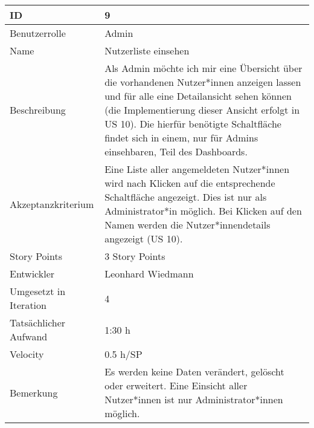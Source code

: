 \begin{tabularx}{\textwidth}{|p{}|X|}
	\hline
	ID & 9\\
	\hline
	Benutzerrolle & Admin\\
	\hline
	Name & Nutzerliste einsehen\\
	\hline
	Beschreibung & Als Admin möchte ich mir eine Übersicht über die vorhandenen Nutzer*innen anzeigen lassen und für alle eine Detailansicht sehen können (die Implementierung dieser Ansicht erfolgt in US 10). Die hierfür benötigte Schaltfläche findet sich in einem, nur für Admins einsehbaren, Teil des Dashboards.\\
	\hline
	Akzeptanzkriterium & Eine Liste aller angemeldeten Nutzer*innen wird nach Klicken auf die entsprechende Schaltfläche angezeigt. Dies ist nur als Administrator*in möglich. Bei Klicken auf den Namen werden die Nutzer*innendetails angezeigt (US 10).\\
	\hline
	Story Points & 3 Story Points\\
	\hline
	Entwickler & Leonhard Wiedmann\\
	\hline
	Umgesetzt in Iteration & 4\\
	\hline
	Tatsächlicher Aufwand & 1:30 h\\
	\hline
	Velocity & 0.5 h/SP\\
	\hline
	Bemerkung & Es werden keine Daten verändert, gelöscht oder erweitert. Eine Einsicht aller Nutzer*innen ist nur Administrator*innen möglich.\\
	\hline
\end{tabularx}
\vspace{20pt}
